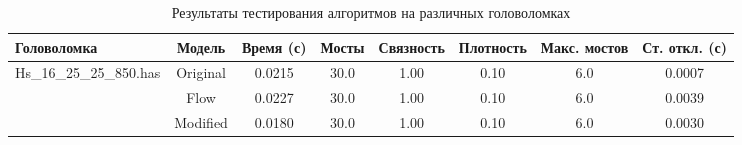 \begin{table}[h]
\centering
\caption{Результаты тестирования алгоритмов на различных головоломках}
\begin{tabular}{|l|c|c|c|c|c|c|c|}
\hline
\textbf{Головоломка} & \textbf{Модель} & \textbf{Время (с)} & \textbf{Мосты} & \textbf{Связность} & \textbf{Плотность} & \textbf{Макс. мостов} & \textbf{Ст. откл. (с)} \\
\hline
\multirow{3}{*}{Hs_16_25_25_850.has} & Original & 0.0215 & 30.0 & 1.00 & 0.10 & 6.0 & 0.0007 \\
 & Flow & 0.0227 & 30.0 & 1.00 & 0.10 & 6.0 & 0.0039 \\
 & Modified & 0.0180 & 30.0 & 1.00 & 0.10 & 6.0 & 0.0030 \\
\hline
\end{tabular}
\end{table}